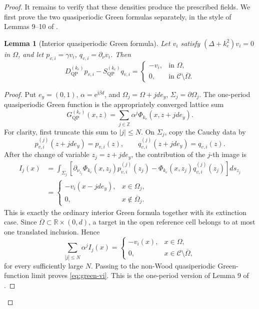 \documentclass[11pt]{article}
\newcommand{\C}{\mathcal C}
\newcommand{\Om}{\Omega}
\newcommand{\Sig}{\Sigma}
\newcommand{\R}{\mathbb R}
\newcommand{\Z}{\mathbb Z}
\newcommand{\ii}{\mathrm i}
\newcommand{\ee}{\mathrm e}
\newcommand{\QP}{\mathrm{QP}}
\theoremstyle{plain}
\newtheorem{lemma}[theorem]{Lemma}
\theoremstyle{definition}
\theoremstyle{remark}
\begin{document}
\begin{proof}
It remains to verify that these densities produce the prescribed fields.  We
first prove the two quasiperiodic Green formulas separately, in the style of
Lemmas 9--10 of \cite[Appendix A]{BarnettGreengard2010}.

\begin{lemma}[Interior quasiperiodic Green formula]
\label{lem:qp-green-interior}
Let \(v_i\) satisfy \((\Delta+k_e^2)v_i=0\) in \(\Om\), and let
\(p_{v,i}=\gamma v_i\), \(q_{v,i}=\partial_\nu v_i\).  Then
\begin{equation}
D_{\QP}^{(k_e)}p_{v,i}-S_{\QP}^{(k_e)}q_{v,i}
=\begin{cases}
-v_i,&\text{in }\Om,\\
0,&\text{in }\C\setminus\overline\Om.
\end{cases}
\label{eq:green-vi}
\end{equation}
\end{lemma}

\begin{proof}
Put \(e_y=(0,1)\), \(\alpha=\ee^{\ii\beta d}\), and
\(\Om_j=\Om+jd e_y\), \(\Sig_j=\partial\Om_j\).  The one-period
quasiperiodic Green function is the appropriately converged lattice sum
\[
G_{\QP}^{(k_e)}(x,z)
=\sum_{j\in\Z}\alpha^j\Phi_{k_e}(x,z+jd e_y).
\]
For clarity, first truncate this sum to \(|j|\leq N\).  On \(\Sig_j\), copy
the Cauchy data by
\[
p_{v,i}^{(j)}(z+jd e_y)=p_{v,i}(z),\qquad
q_{v,i}^{(j)}(z+jd e_y)=q_{v,i}(z).
\]
After the change of variable \(z_j=z+jd e_y\), the contribution of the
\(j\)-th image is
\[
\begin{aligned}
I_j(x)
&=\int_{\Sig_j}
 \left[\partial_{\nu_{z_j}}\Phi_{k_e}(x,z_j)
             p_{v,i}^{(j)}(z_j)
       -\Phi_{k_e}(x,z_j)q_{v,i}^{(j)}(z_j)\right]ds_{z_j}\\
&=\begin{cases}
-v_i(x-jd e_y),&x\in\Om_j,\\
0,&x\notin\overline\Om_j.
\end{cases}
\end{aligned}
\]
This is exactly the ordinary interior Green formula together with its
extinction case.  Since \(\overline\Om\subset\R\times(0,d)\), a target in the
open reference cell belongs to at most one translated inclusion.  Hence
\[
\sum_{|j|\leq N}\alpha^j I_j(x)
=\begin{cases}-v_i(x),&x\in\Om,\\0,&x\in\C\setminus\overline\Om,
\end{cases}
\]
for every sufficiently large \(N\).  Passing to the non-Wood quasiperiodic
Green-function limit proves \eqref{eq:green-vi}.  This is the one-period
version of Lemma 9 of \cite[Appendix A]{BarnettGreengard2010}.
\end{proof}


\end{proof}
\end{document}
